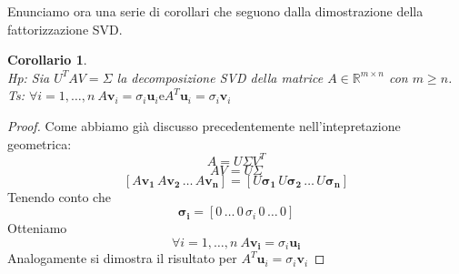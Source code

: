\documentclass[11pt]{article}
\newtheorem{corollary}{Corollario}
\newcommand{\R}{\mathbb R}
\begin{document}
\noindent
Enunciamo ora una serie di corollari che seguono dalla dimostrazione della fattorizzazione SVD.
\begin{corollary}
\textbf{}\\
\textit{Hp:} Sia $U^TAV=\Sigma$ la decomposizione SVD della matrice $A\in \R^{m \times n}$ con $m \geq n$. \\
\textit{Ts:} $\forall i=1, \dots ,n \ A \mathbf{v}_i= \sigma_i \mathbf{u}_i \text{e} A^T \mathbf{u}_i = \sigma_i \mathbf{v}_i$  
\end{corollary}
\begin{proof}
Come abbiamo già discusso precedentemente nell'intepretazione geometrica:
\[
A = U\Sigma V^T 
\]
\[
AV = U\Sigma
\]
\[ 
[A\mathbf{v_1} \, A\mathbf{v_2} \, \dots \, A\mathbf{v_n}] = [U\mathbf{\sigma_1} \, U\mathbf{\sigma_2} \, \dots \, U\mathbf{\sigma_n}]
\]
Tenendo conto che 
\[
\mathbf{\sigma_i}=[0 \, \dots \, 0 \, \sigma_i \, 0 \, \dots \, 0]
\]
Otteniamo
$$\forall i=1,\dots,n\ A\mathbf{v_i}=\sigma_i\mathbf{u_i}
$$
Analogamente si dimostra il risultato per $A^T \mathbf{u}_i = \sigma_i \mathbf{v}_i$
\end{proof}
\end{document}
